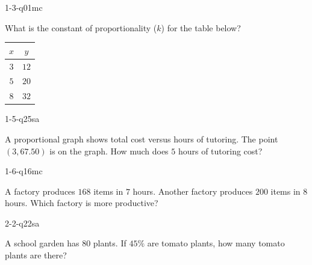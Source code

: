 
\begin{practiceQuestion}{1-3-q01}{mc}
\begin{questionText}
What is the constant of proportionality ($k$) for the table below?

\begin{center}
\begin{tabular}{|c|c|}
\hline $x$ & $y$ \\ \hline $3$ & $12$ \\ $5$ & $20$ \\ $8$ & $32$ \\ \hline
\end{tabular}
\end{center}
\end{questionText}
\end{practiceQuestion}

\begin{practiceQuestion}{1-5-q25}{sa}
\begin{questionText}
A proportional graph shows total cost versus hours of tutoring. The point $(3, 67.50)$ is on the graph. How much does $5$ hours of tutoring cost?
\end{questionText}
\end{practiceQuestion}

\begin{practiceQuestion}{1-6-q16}{mc}
\begin{questionText}
A factory produces $168$ items in $7$ hours. Another factory produces $200$ items in $8$ hours. Which factory is more productive?
\end{questionText}
\end{practiceQuestion}

\begin{practiceQuestion}{2-2-q22}{sa}
\begin{questionText}
A school garden has $80$ plants. If $45\%$ are tomato plants, how many tomato plants are there?
\end{questionText}
\end{practiceQuestion}

